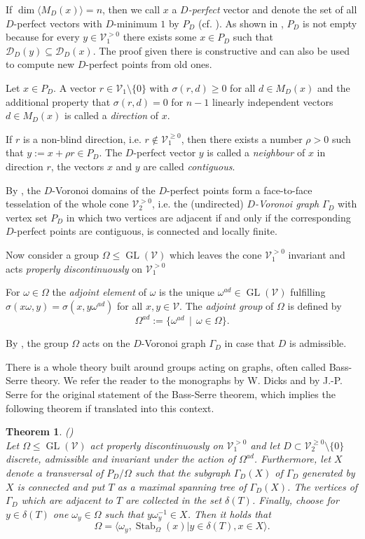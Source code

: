\documentclass[10pt, preprint]{elsarticle}
\newtheorem{theorem}{Theorem}[section]
\theoremstyle{definition}
\theoremstyle{definition}
\newcommand{\calD}{\mathcal{D}}
\newcommand{\V}{\mathcal{V}}
\newcommand{\w}{\omega}
\newcommand{\Stab}{\operatorname{Stab}}
\newcommand{\GL}{\operatorname{GL}}
\newcommand{\Vgt}{\V_1^{>0}}
\newcommand{\Wgt}{\V_2^{>0}}
\newcommand{\Vgeq}{\V_1^{\geq 0}}
\newcommand{\Wgeq}{\V_2^{\geq 0}}
\begin{document}
If $\dim\langle M_D(x)\rangle=n$, then we call $x$ a $D$\emph{-perfect} vector and denote the set of all $D$-perfect vectors with $D$-minimum $1$ by $P_D$ (cf. \cite[Definition 1.2]{Opg01}). As shown in \cite[Proposition 1.8]{Opg01}, $P_D$ is not empty because for every $y\in\Vgt$ there exists some $x\in P_D$ such that $\calD_D(y)\subseteq\calD_D(x)$. The proof given there is constructive and can also be used to compute new $D$-perfect points from old ones.

Let $x\in P_D$. A vector $r\in\V_1\setminus\{0\}$ with $\sigma(r,d) \geq 0$ for all $d\in M_D(x)$ and the additional property that $\sigma(r,d)=0$ for $n-1$ linearly independent vectors $d\in M_D(x)$ is called a \emph{direction} of $x$. 

If $r$ is a non-blind direction, i.e. $r\notin\Vgeq$, then there exists a number $\rho>0$ such that $y:=x+\rho r\in P_D$. The $D$-perfect vector $y$ is called a \emph{neighbour} of $x$ in direction $r$, the vectors $x$ and $y$ are called \emph{contiguous}. 

By \cite[Theorem 1.9]{Opg01}, the $D$-Voronoi domains of the $D$-perfect points form a face-to-face tesselation of the whole cone $\Wgt$, i.e. the (undirected) $D$\emph{-Voronoi graph} $\Gamma_D$ with vertex set $P_D$ in which  two vertices are adjacent if and only if the corresponding $D$-perfect points are contiguous, is connected and locally finite.

Now consider a group $\Omega\leq\GL(\V)$ which leaves the cone $\Vgt$ invariant and acts \emph{properly discontinuously} on $\Vgt$

For $\w\in\Omega$ the \emph{adjoint element} of $\w$ is the unique $\w^{ad}\in\GL(\V)$ fulfilling $\sigma(x\w,y)=\sigma(x,y\w^{ad})$ for all $x,y\in\V$. The \emph{adjoint group} of $\Omega$ is defined by
\[\Omega^{ad}:=\{\w^{ad}\,\mid\, \omega\in\Omega\}.\]

By \cite[Lemma 2.1]{Opg01}, the group $\Omega$ acts on the $D$-Voronoi graph $\Gamma_D$ in case that $D$ is admissible.

There is a whole theory built around groups acting on graphs, often called Bass-Serre theory. We refer the reader to the monographs \cite{Dicks} by W. Dicks and \cite{Ser} by J.-P. Serre for the original statement of the Bass-Serre theorem, which implies the following theorem if translated into this context.
\begin{theorem}\label{theoBassSerre}(\cite[Theorem 2.2]{Opg01})\mbox{}\\
Let $\Omega\leq\GL(\V)$ act properly discontinuously on $\Vgt$ and let $D\subset\Wgeq\setminus\{0\}$ discrete, admissible and invariant under the action of $\Omega^{ad}$. Furthermore, let $X$ denote a transversal of $P_D/\Omega$ such that the subgraph $\Gamma_D(X)$ of $\Gamma_D$ generated by $X$ is connected and put $T$ as a maximal spanning tree of $\Gamma_D(X)$. The vertices of $\Gamma_D$ which are adjacent to $T$ are collected in the set $\delta(T)$. Finally, choose for $y\in \delta(T)$ one $\w_y\in\Omega$ such that $y\w_y^{-1}\in X$. Then it holds that
\[\Omega=\langle \w_y,\Stab_\Omega(x) | y\in\delta(T), x\in X\rangle.\]
\end{theorem}
\end{document}
